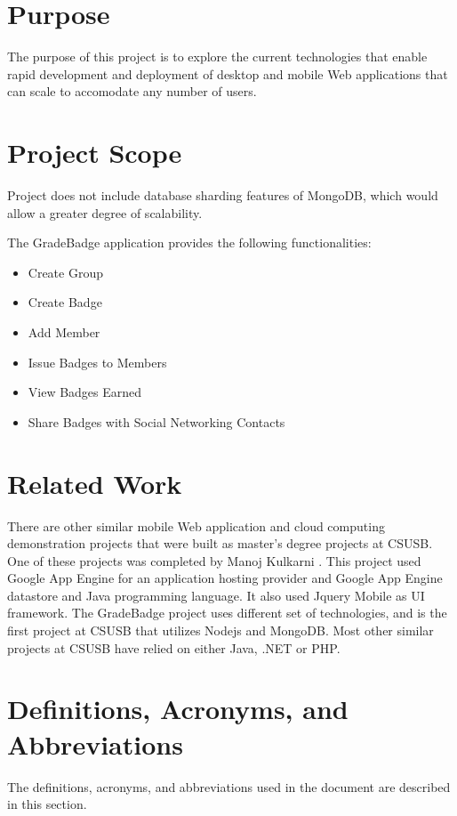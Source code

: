 \section{Purpose}
The purpose of this project is to explore the current technologies that enable rapid development and deployment of desktop and mobile Web applications that can scale to accomodate any number of users.

\section{Project Scope}
Project does not include database sharding features of MongoDB, which would allow a greater degree of scalability.

The GradeBadge application provides the following functionalities:
\begin{itemize}
\item Create Group
\item Create Badge 
\item Add Member
\item Issue Badges to Members
\item View Badges Earned
\item Share Badges with Social Networking Contacts
\end{itemize}

\section{Related Work}
There are other similar mobile Web application and cloud computing demonstration projects that were built as master's degree projects at CSUSB.  One of these projects was completed by Manoj Kulkarni \cite{Manoj}.  This project used Google App Engine for an application hosting provider and Google App Engine datastore and Java programming language. It also used Jquery Mobile as UI framework. The GradeBadge project uses different set of technologies, and is the first project at CSUSB that utilizes Nodejs and MongoDB.  Most other similar projects at CSUSB have relied on either Java, .NET or PHP.

\section{Definitions, Acronyms, and Abbreviations}

The definitions, acronyms, and abbreviations used in the document are described in this section.

